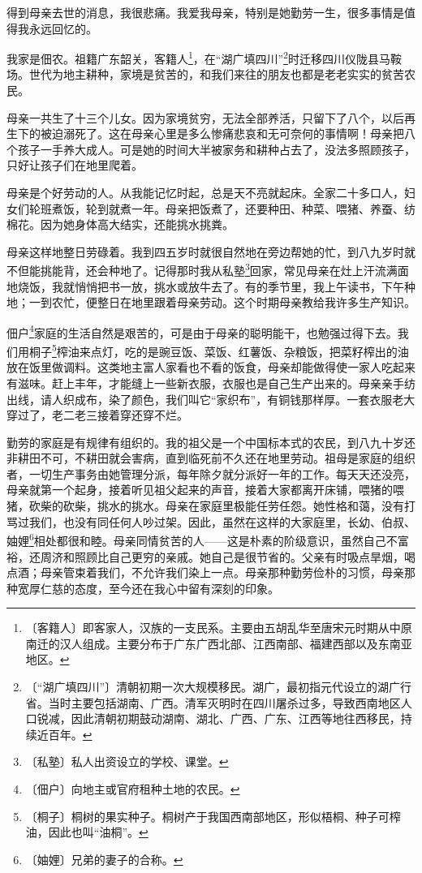 \documentclass[12pt,UTF-8,openany]{ctexbook}
\begin{document}
\begin{large}
    
    得到母亲去世的消息，我很悲痛。我爱我母亲，特别是她勤劳一生，很多事情是值得我永远回忆的。
    
    我家是佃农。祖籍广东韶关，客籍人\footnote{〔客籍人〕即客家人，汉族的一支民系。主要由五胡乱华至唐宋元时期从中原南迁的汉人组成。主要分布于广东广西北部、江西南部、福建西部以及东南亚地区。}，在“湖广填四川”\footnote{〔“湖广填四川”〕清朝初期一次大规模移民。湖广，最初指元代设立的湖广行省。当时主要包括湖南、广西。清军灭明时在四川屠杀过多，导致西南地区人口锐减，因此清朝初期鼓动湖南、湖北、广西、广东、江西等地往西移民，持续近百年。}时迁移四川仪陇县马鞍场。世代为地主耕种，家境是贫苦的，和我们来往的朋友也都是老老实实的贫苦农民。
    
    母亲一共生了十三个儿女。因为家境贫穷，无法全部养活，只留下了八个，以后再生下的被迫溺死了。这在母亲心里是多么惨痛悲哀和无可奈何的事情啊！母亲把八个孩子一手养大成人。可是她的时间大半被家务和耕种占去了，没法多照顾孩子，只好让孩子们在地里爬着。
    
    母亲是个好劳动的人。从我能记忆时起，总是天不亮就起床。全家二十多口人，妇女们轮班煮饭，轮到就煮一年。母亲把饭煮了，还要种田、种菜、喂猪、养蚕、纺棉花。因为她身体高大结实，还能挑水挑粪。
    
    母亲这样地整日劳碌着。我到四五岁时就很自然地在旁边帮她的忙，到八九岁时就不但能挑能背，还会种地了。记得那时我从私塾\footnote{〔私塾〕私人出资设立的学校、课堂。}回家，常见母亲在灶上汗流满面地烧饭，我就悄悄把书一放，挑水或放牛去了。有的季节里，我上午读书，下午种地；一到农忙，便整日在地里跟着母亲劳动。这个时期母亲教给我许多生产知识。
    
    佃户\footnote{〔佃户〕向地主或官府租种土地的农民。}家庭的生活自然是艰苦的，可是由于母亲的聪明能干，也勉强过得下去。我们用桐子\footnote{〔桐子〕桐树的果实种子。桐树产于我国西南部地区，形似梧桐、种子可榨油，因此也叫“油桐”。}榨油来点灯，吃的是豌豆饭、菜饭、红薯饭、杂粮饭，把菜籽榨出的油放在饭里做调料。这类地主富人家看也不看的饭食，母亲却能做得使一家人吃起来有滋味。赶上丰年，才能缝上一些新衣服，衣服也是自己生产出来的。母亲亲手纺出线，请人织成布，染了颜色，我们叫它“家织布”，有铜钱那样厚。一套衣服老大穿过了，老二老三接着穿还穿不烂。
    
    勤劳的家庭是有规律有组织的。我的祖父是一个中国标本式的农民，到八九十岁还非耕田不可，不耕田就会害病，直到临死前不久还在地里劳动。祖母是家庭的组织者，一切生产事务由她管理分派，每年除夕就分派好一年的工作。每天天还没亮，母亲就第一个起身，接着听见祖父起来的声音，接着大家都离开床铺，喂猪的喂猪，砍柴的砍柴，挑水的挑水。母亲在家庭里极能任劳任怨。她性格和蔼，没有打骂过我们，也没有同任何人吵过架。因此，虽然在这样的大家庭里，长幼、伯叔、妯娌\footnote{〔妯娌〕兄弟的妻子的合称。}相处都很和睦。母亲同情贫苦的人——这是朴素的阶级意识，虽然自己不富裕，还周济和照顾比自己更穷的亲戚。她自己是很节省的。父亲有时吸点旱烟，喝点酒；母亲管束着我们，不允许我们染上一点。母亲那种勤劳俭朴的习惯，母亲那种宽厚仁慈的态度，至今还在我心中留有深刻的印象。
    

\end{large}
\end{document}
